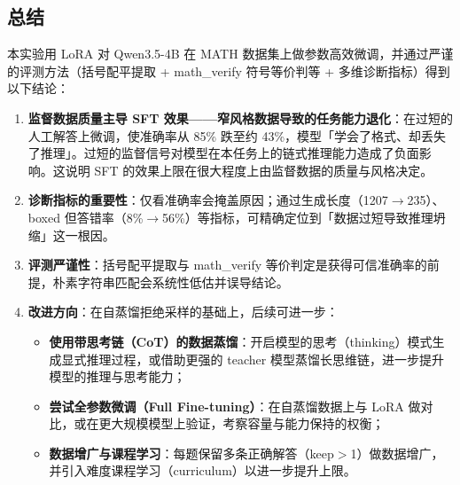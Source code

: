 \subsection{总结}

本实验用 LoRA 对 Qwen3.5-4B 在 MATH 数据集上做参数高效微调，并通过严谨的评测方法（括号配平提取 + math\_verify 符号等价判等 + 多维诊断指标）得到以下结论：

\begin{enumerate}
  \item \textbf{监督数据质量主导 SFT 效果——窄风格数据导致的任务能力退化}：在过短的人工解答上微调，使准确率从 85\% 跌至约 43\%，模型「学会了格式、却丢失了推理」。过短的监督信号对模型在本任务上的链式推理能力造成了负面影响。这说明 SFT 的效果上限在很大程度上由监督数据的质量与风格决定。
  \item \textbf{诊断指标的重要性}：仅看准确率会掩盖原因；通过生成长度（1207$\to$235）、boxed 但答错率（8\%$\to$56\%）等指标，可精确定位到「数据过短导致推理坍缩」这一根因。
  \item \textbf{评测严谨性}：括号配平提取与 math\_verify 等价判定是获得可信准确率的前提，朴素字符串匹配会系统性低估并误导结论。
  \item \textbf{改进方向}：在自蒸馏拒绝采样的基础上，后续可进一步：
  \begin{itemize}
    \item \textbf{使用带思考链（CoT）的数据蒸馏}：开启模型的思考（thinking）模式生成显式推理过程，或借助更强的 teacher 模型蒸馏长思维链，进一步提升模型的推理与思考能力；
    \item \textbf{尝试全参数微调（Full Fine-tuning）}：在自蒸馏数据上与 LoRA 做对比，或在更大规模模型上验证，考察容量与能力保持的权衡；
    \item \textbf{数据增广与课程学习}：每题保留多条正确解答（keep$>$1）做数据增广，并引入难度课程学习（curriculum）以进一步提升上限。
  \end{itemize}
\end{enumerate}
